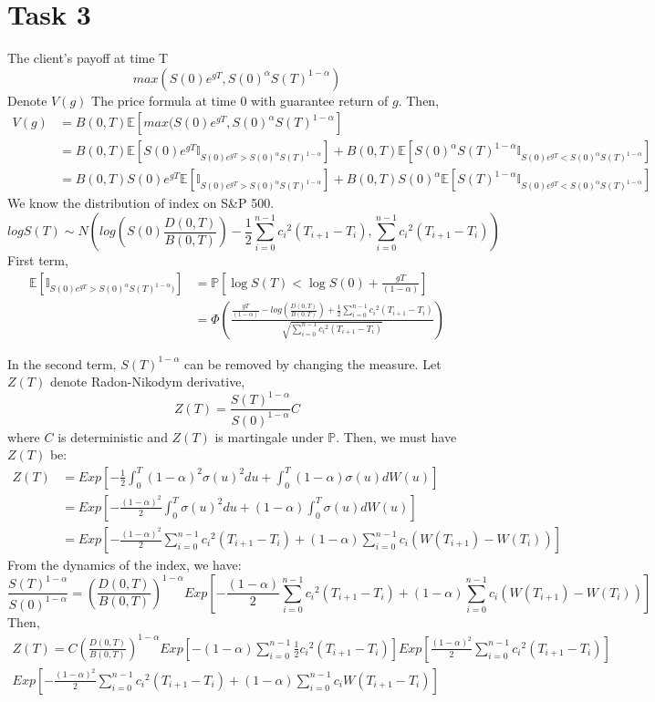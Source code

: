 \section*{Task 3}
The client's payoff at time T
\[max(S(0)e^{gT},S(0)^\alpha S(T)^{1-\alpha})\]
Denote \(V(g)\) The price formula at time 0 with guarantee return of \(g\). Then,
\begin{align*}
V(g) &= B(0,T)\mathbb{E}[ max(S(0)e^{gT},S(0)^\alpha S(T)^{1-\alpha}] \\
&= B(0,T) \mathbb{E}[ S(0)e^{gT}\mathbb{I}_{S(0)e^{gT}>S(0)^\alpha S(T)^{1-\alpha}}]+B(0,T) \mathbb{E}[S(0)^\alpha S(T)^{1-\alpha}\mathbb{I}_{S(0)e^{gT}<S(0)^\alpha S(T)^{1-\alpha}}] \\
&=  B(0,T)S(0)e^{gT}\mathbb{E}[ \mathbb{I}_{S(0)e^{gT}>S(0)^\alpha S(T)^{1-\alpha}}]+ B(0,T)S(0)^\alpha \mathbb{E}[S(T)^{1-\alpha}\mathbb{I}_{S(0)e^{gT}<S(0)^\alpha S(T)^{1-\alpha}}]
\end{align*}
We know the distribution of index on S\&P 500.
\[log S(T) \sim N \left(log \left( S(0)\frac{D(0,T)}{B(0,T)}\right)-\frac{1}{2}\sum_{i=0}^{n-1} {c_i}^2(T_{i+1}-T_{i}),\sum_{i=0}^{n-1} {c_i}^2(T_{i+1}-T_{i})\right)\]
First term, 
\begin{align*}
  \mathbb{E}[ \mathbb{I}_{S(0)e^{gT}>S(0)^\alpha S(T)^{1-\alpha})}]&= \mathbb{P}\left[ {\log S(T)<\log S(0)+\frac{gT}{(1-\alpha)} }\right]\\
  &=\Phi\left(\frac{\frac{gT}{(1-\alpha)}-log \left( \frac{D(0,T)}{B(0,T)}\right)+\frac{1}{2}\sum_{i=0}^{n-1} {c_i}^2(T_{i+1}-T_{i})}{\sqrt{\sum_{i=0}^{n-1} {c_i}^2(T_{i+1}-T_{i})}}\right)
\end{align*}

In the second term, \( S(T)^{1-\alpha}\) can be removed by changing the measure.
Let \(Z(T)\) denote Radon-Nikodym derivative,
\[Z(T)= \frac{S(T)^{1-\alpha}}{S(0)^{1-\alpha}} C\]
where \(C\) is deterministic and \(Z(T)\) is martingale under \(\mathbb{P}\). Then, we must have \(Z(T)\) be:
\begin{align*}
    Z(T) &= Exp\left[-\frac{1}{2}\int_0^T (1-\alpha)^2\sigma(u)^2du+\int_0^T(1-\alpha)\sigma(u)dW(u)\right] \\
    &= Exp\left[-\frac{(1-\alpha)^2}{2}\int_0^T\sigma(u)^2du+(1-\alpha)\int_0^T\sigma(u)dW(u)\right] \\
    &= Exp\left[-\frac{(1-\alpha)^2}{2}\sum_{i=0}^{n-1}{c_i}^2(T_{i+1}-T_{i})+(1-\alpha)\sum_{i=0}^{n-1} c_i (W(T_{i+1})-W(T_{i}))\right]
\end{align*}
From the dynamics of the index, we have:
\[\frac{S(T)^{1-\alpha}}{S(0)^{1-\alpha}}=\left(\frac{D(0,T)}{B(0,T)}\right)^{1-\alpha}Exp\left[-\frac{(1-\alpha)}{2}\sum_{i=0}^{n-1} {c_i}^2(T_{i+1}-T_{i})+(1-\alpha)\sum_{i=0}^{n-1} c_i (W(T_{i+1})-W(T_{i}))\right]\]
Then,
\begin{multline*}
    Z(T)=C\left(\frac{D(0,T)}{B(0,T)}\right)^{1-\alpha}Exp\left[-(1-\alpha)\sum_{i=0}^{n-1} \frac{1}{2}{c_i}^2(T_{i+1}-T_{i})\right] 
    Exp\left[\frac{(1-\alpha)^2}{2}\sum_{i=0}^{n-1}{c_i}^2(T_{i+1}-T_{i})\right]\\
    Exp\left[-\frac{(1-\alpha)^2}{2}\sum_{i=0}^{n-1}{c_i}^2(T_{i+1}-T_{i})+(1-\alpha)\sum_{i=0}^{n-1} c_i W(T_{i+1}-T_{i})\right]
\end{multline*}

